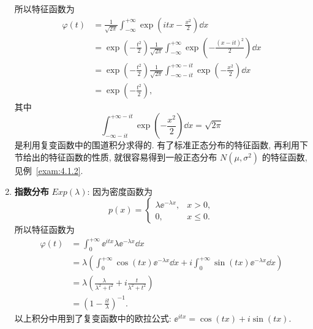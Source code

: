 \begin{example}
\begin{enumerate}
\begin{equation*}
        \end{equation*}
        所以特征函数为
        \begin{align*}
            \varphi (t) & = \frac{1}{\sqrt{2\pi}} \int_{-\infty}^{+\infty} \exp \left( itx - \frac{x^2}{2} \right) \dd x\\
            & = \exp \left( -\frac{t^2}{2} \right) \frac{1}{\sqrt{2\pi}} \int_{-\infty}^{+\infty} \exp \left( -\frac{( x - it )^2}{2} \right) \dd x\\
            & = \exp \left( -\frac{t^2}{2} \right) \frac{1}{\sqrt{2\pi}} \int_{-\infty -it}^{+\infty -it} \exp \left( -\frac{x^2}{2} \right) \dd x\\
            & = \exp \left( -\frac{t^2}{2} \right),
        \end{align*}
        其中
        \begin{equation*}
            \int_{-\infty -it}^{+\infty -it} \exp \left( -\frac{x^2}{2} \right) \dd x = \sqrt{2\pi}
        \end{equation*}
        是利用复变函数中的围道积分求得的.
        有了标准正态分布的特征函数,
        再利用下节给出的特征函数的性质,
        就很容易得到一般正态分布 $ N ( \mu, \sigma^2 ) $ 的特征函数,
        见例~\ref{exam:4.1.2}.
        \item
        \textbf{指数分布} $ Exp ( \lambda ) $: 因为密度函数为
        \begin{equation*}
            p (x) =
            \begin{cases}
                \lambda \ee^{-\lambda x}, & x > 0,\\
                0, & x \leq 0.
            \end{cases}
        \end{equation*}
        所以特征函数为
        \begin{align*}
            \varphi (t) & = \int_0^{+\infty} \ee^{itx} \lambda \ee^{-\lambda x} \dd x\\
            & = \lambda \left( \int_0^{+\infty} \cos (tx) \ee^{-\lambda x} \dd x + i \int_0^{+\infty} \sin (tx) \ee^{-\lambda x} \dd x \right)\\
            & = \lambda \left( \frac{\lambda}{\lambda^2 + t^2} + i \frac{t}{\lambda^2 + t^2} \right)\\
            & = \left( 1 - \frac{it}{\lambda} \right)^{-1}.
        \end{align*}
        以上积分中用到了复变函数中的欧拉公式: $ \ee^{itx} = \cos (tx) + i \sin ( tx) $.
    \end{enumerate}
\end{example}

